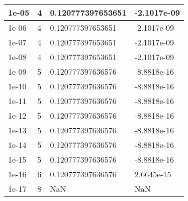 \begin{tabular}{|l|l|l|l|}
\hline
1e-05&4&0.120777397653651&-2.1017e-09\\\hline
1e-06&4&0.120777397653651&-2.1017e-09\\\hline
1e-07&4&0.120777397653651&-2.1017e-09\\\hline
1e-08&4&0.120777397653651&-2.1017e-09\\\hline
1e-09&5&0.120777397636576&-8.8818e-16\\\hline
1e-10&5&0.120777397636576&-8.8818e-16\\\hline
1e-11&5&0.120777397636576&-8.8818e-16\\\hline
1e-12&5&0.120777397636576&-8.8818e-16\\\hline
1e-13&5&0.120777397636576&-8.8818e-16\\\hline
1e-14&5&0.120777397636576&-8.8818e-16\\\hline
1e-15&5&0.120777397636576&-8.8818e-16\\\hline
1e-16&6&0.120777397636576&2.6645e-15\\\hline
1e-17&8&NaN&NaN\\\hline
\end{tabular}
